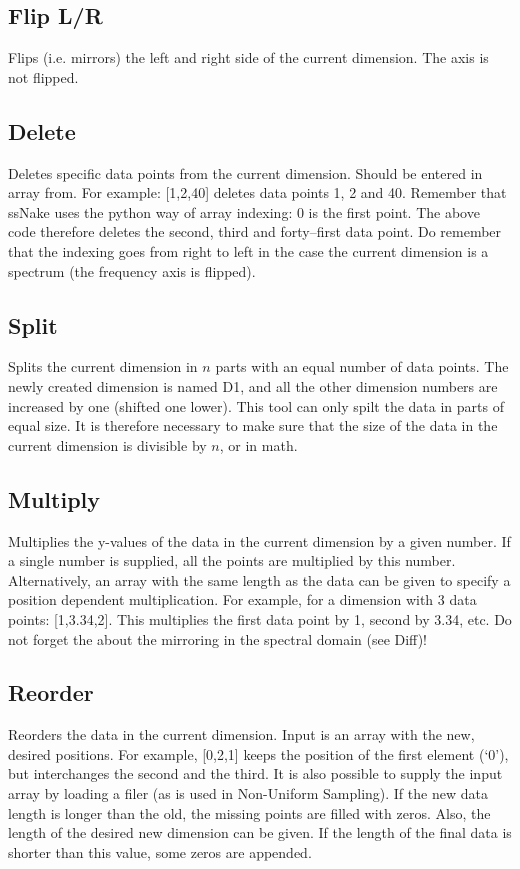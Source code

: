 \documentclass[11pt,a4paper]{article}
\begin{document}
\subsection{Flip L/R}
Flips (i.e. mirrors) the left and right side of the current dimension. The axis is not flipped.

\subsection{Delete}
Deletes specific data points from the current dimension. Should be entered in array from. For example: [1,2,40] deletes data points 1, 2 and 40. Remember that ssNake uses the python way of array indexing: 0 is the first point. The above code therefore deletes the second, third and forty--first data point. Do remember that the indexing goes from right to left in the case the current dimension is a spectrum (the frequency axis is flipped).

\subsection{Split}
Splits the current dimension in $n$ parts with an equal number of data points. The newly created dimension is named D1, and all the other dimension numbers are increased by one (shifted one lower). This tool can only spilt the data in parts of equal size. It is therefore necessary to make sure that the size of the data in the current dimension is divisible by $n$, or in math.

\subsection{Multiply}
Multiplies the y-values of the data in the current dimension by a given number. If a single number is supplied, all the points are multiplied by this number. Alternatively, an array with the same length as the data can be given to specify a position dependent multiplication. For example, for a dimension with 3 data points: [1,3.34,2]. This multiplies the first data point by 1, second by 3.34, etc. Do not forget the about the mirroring in the spectral domain (see Diff)!

\subsection{Reorder}
Reorders the data in the current dimension. Input is an array with the new,
desired positions. For example, [0,2,1] keeps the position of the first element
(`0'), but interchanges the second and the third. It is also possible to supply
the input array by loading a filer (as is used in Non-Uniform Sampling). If the
new data length is longer than the old, the missing points are filled with
zeros. Also, the length of the desired new dimension can be given. If the
length of the final data is shorter than this value, some zeros are appended.
\end{document}

